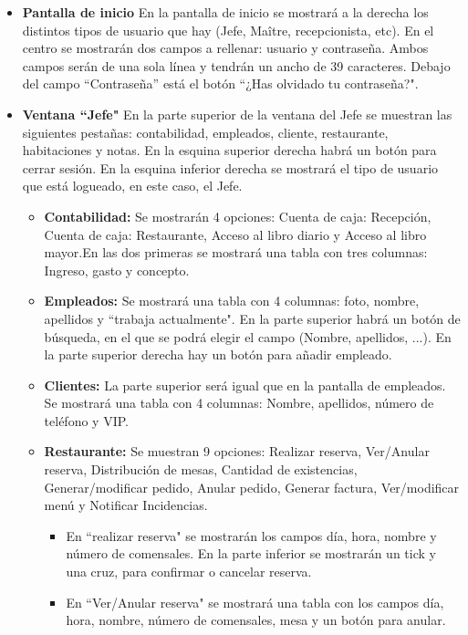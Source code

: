 \documentclass[spanish,a4paper,11pt, twoside]{report}	%
\begin{document}
			\begin{itemize}
				\item \textbf{Pantalla de inicio} En la pantalla de inicio se mostrará a la derecha los distintos tipos de usuario que hay (Jefe, Maître, recepcionista, etc). En el centro se mostrarán dos campos a rellenar: usuario y contraseña. Ambos campos serán de una sola línea y tendrán un ancho de 39 caracteres. Debajo del campo “Contraseña'' está el botón “¿Has olvidado tu contraseña?".
				\item \textbf{Ventana “Jefe"} En la parte superior de la ventana del Jefe se muestran las siguientes pestañas: contabilidad, empleados, cliente, restaurante, habitaciones y notas. En la esquina superior derecha habrá un botón para cerrar sesión. En la esquina inferior derecha se mostrará el tipo de usuario que está logueado, en este caso, el Jefe. 
				\begin{itemize}
					\item \textbf{Contabilidad: }Se mostrarán 4 opciones: Cuenta de caja: Recepción, Cuenta de caja: Restaurante, Acceso al libro diario y Acceso al libro mayor.En las dos primeras se mostrará una tabla con tres columnas: Ingreso, gasto y concepto.
					 \item \textbf{Empleados: }Se mostrará una tabla con 4 columnas: foto, nombre, apellidos y “trabaja actualmente". En la parte superior habrá un botón de búsqueda, en el que se podrá elegir el campo (Nombre, apellidos, ...).
						En la parte superior derecha hay un botón para añadir empleado. 
					 \item \textbf{Clientes: }La parte superior será igual que en la pantalla de empleados. Se mostrará una tabla con 4 columnas: Nombre, apellidos, número de teléfono y VIP. 
					 \item \textbf{Restaurante: }Se muestran 9 opciones: Realizar reserva, Ver/Anular reserva, Distribución de mesas, Cantidad de existencias, Generar/modificar pedido, Anular pedido, Generar factura, Ver/modificar menú y Notificar Incidencias.
					\begin{itemize}
						\item En “realizar reserva" se mostrarán los campos día, hora, nombre y número de comensales. En la parte inferior se mostrarán un tick y una cruz, para confirmar o cancelar reserva. 
						\item En “Ver/Anular reserva" se mostrará una tabla con los campos día, hora, nombre, número de comensales, mesa y un botón para anular. 

\end{itemize}
\end{itemize}
\end{itemize}
\end{document}
